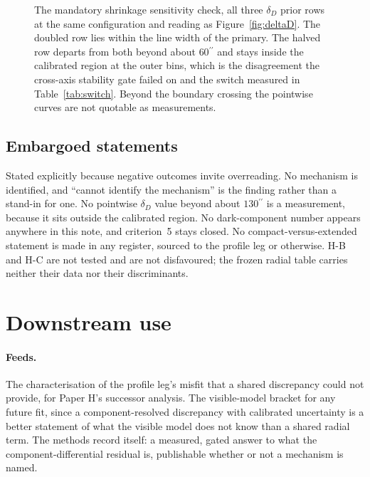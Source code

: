 \documentclass[11pt]{article}
\newcommand{\as}{\ensuremath{^{\prime\prime}}}
\newcommand{\dD}{\ensuremath{\delta_D}}
\begin{document}
\begin{figure}[htbp]
\caption{The mandatory shrinkage sensitivity check, all three \dD{} prior rows at the same configuration and reading as Figure~\ref{fig:deltaD}. The doubled row lies within the line width of the primary. The halved row departs from both beyond about $60\as$ and stays inside the calibrated region at the outer bins, which is the disagreement the cross-axis stability gate failed on and the switch measured in Table~\ref{tab:switch}. Beyond the boundary crossing the pointwise curves are not quotable as measurements.}
\label{fig:shrinkage}
\end{figure}

\subsection{Embargoed statements}
\label{sec:notquotable}

Stated explicitly because negative outcomes invite overreading. No mechanism is identified, and ``cannot identify the mechanism'' is the finding rather than a stand-in for one. No pointwise \dD{} value beyond about $130\as$ is a measurement, because it sits outside the calibrated region. No dark-component number appears anywhere in this note, and criterion~5 stays closed. No compact-versus-extended statement is made in any register, sourced to the profile leg or otherwise. H-B and H-C are not tested and are not disfavoured; the frozen radial table carries neither their data nor their discriminants.

\section{Downstream use}
\label{sec:feeds}

\paragraph{Feeds.} The characterisation of the profile leg's misfit that a shared discrepancy could not provide, for Paper H's successor analysis. The visible-model bracket for any future fit, since a component-resolved discrepancy with calibrated uncertainty is a better statement of what the visible model does not know than a shared radial term. The methods record itself: a measured, gated answer to what the component-differential residual is, publishable whether or not a mechanism is named.
\end{document}

